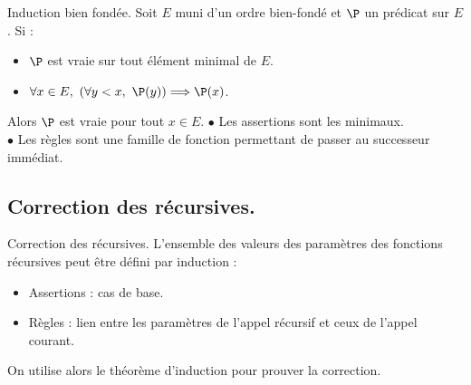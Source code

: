 \documentclass[french, 11pt]{article}
\begin{document}
\pagebreak

\begin{corr}{Induction bien fondée.}{}
    Soit $E$ muni d'un ordre bien-fondé et $\P$ un prédicat sur $E$. Si :
    \begin{itemize}[topsep=0pt,itemsep=-0.9 ex]
        \item $\P$ est vraie sur tout élément minimal de $E$.
        \item $\forall x\in E, ~ (\forall y<x, ~ \P(y)) \Longrightarrow \P(x)$.
    \end{itemize}
    Alors $\P$ est vraie pour tout $x\in E$.
    \tcblower
    $\bullet$ Les assertions sont les minimaux.\\
    $\bullet$ Les règles sont une famille de fonction permettant de passer au successeur immédiat.
\end{corr}

\subsection{Correction des récursives.}

\begin{meth}{Correction des récursives.}{}
    L'ensemble des valeurs des paramètres des fonctions récursives peut être défini par induction :
    \begin{itemize}[topsep=0pt,itemsep=-0.9 ex]
        \item Assertions : cas de base.
        \item Règles : lien entre les paramètres de l'appel récursif et ceux de l'appel courant.
    \end{itemize}
    On utilise alors le théorème d'induction pour prouver la correction.
\end{meth}
\end{document}
